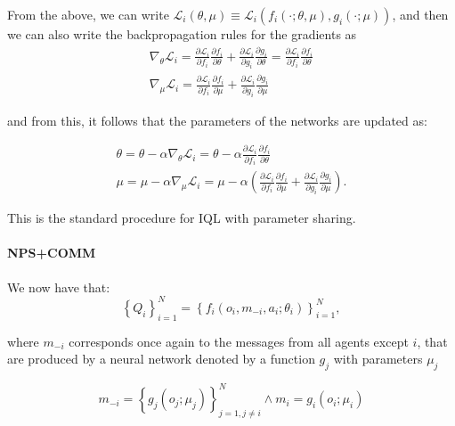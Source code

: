 \documentclass{article}
\begin{document}
From the above, we can write $\mathcal{L}_i(\theta, \mu) \equiv \mathcal{L}_i\left(f_i(\cdot ; \theta, \mu), g_i(\cdot ; \mu)\right)$, and then we can also write the backpropagation rules for the gradients as
\begin{equation}
\begin{gathered}
\nabla_\theta \mathcal{L}_i=\frac{\partial \mathcal{L}_i}{\partial f_i} \frac{\partial f_i}{\partial \theta}+\frac{\partial \mathcal{L}_i}{\partial g_i} \frac{\partial g_i}{\partial \theta}=\frac{\partial \mathcal{L}_i}{\partial f_i} \frac{\partial f_i}{\partial \theta} \\
\nabla_\mu \mathcal{L}_i=\frac{\partial \mathcal{L}_i}{\partial f_i} \frac{\partial f_i}{\partial \mu}+\frac{\partial \mathcal{L}_i}{\partial g_i} \frac{\partial g_i}{\partial \mu}
\end{gathered}
\end{equation}

and from this, it follows that the parameters of the networks are updated as:

\begin{equation}
\begin{gathered}
\theta=\theta-\alpha \nabla_\theta \mathcal{L}_i=\theta-\alpha \frac{\partial \mathcal{L}_i}{\partial f_i} \frac{\partial f_i}{\partial \theta} \\
\mu=\mu-\alpha \nabla_\mu \mathcal{L}_i=\mu-\alpha\left(\frac{\partial \mathcal{L}_i}{\partial f_i} \frac{\partial f_i}{\partial \mu}+\frac{\partial \mathcal{L}_i}{\partial g_i} \frac{\partial g_i}{\partial \mu}\right) .
\end{gathered}
\end{equation}

This is the standard procedure for IQL with parameter sharing. 

\paragraph{NPS+COMM} We now have that:
\begin{equation}
\left\{Q_i\right\}_{i=1}^N=\left\{f_i\left(o_i, m_{-i}, a_i ; \theta_i\right)\right\}_{i=1}^N,
\end{equation}

where $m_{-i}$ corresponds once again to the messages from all agents except $i$, that are produced by a neural network denoted by a function $g_j$ with parameters $\mu_j$

\begin{equation}\label{eq:iql_ps_message}
m_{-i}=\left\{g_j\left(o_j ; \mu_j\right)\right\}_{j=1, j \neq i}^N \wedge m_i=g_i\left(o_i ; \mu_i\right)
\end{equation}
\end{document}
